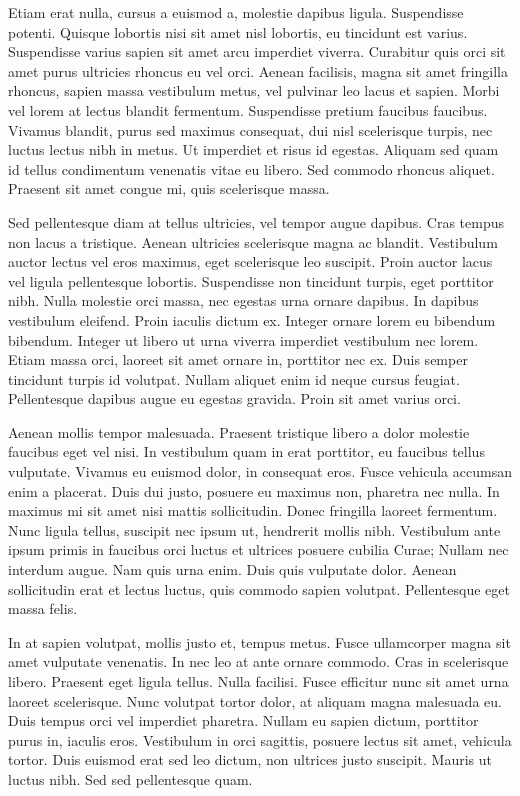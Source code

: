 Etiam erat nulla, cursus a euismod a, molestie dapibus ligula. Suspendisse potenti. Quisque lobortis nisi sit amet nisl lobortis, eu tincidunt est varius. Suspendisse varius sapien sit amet arcu imperdiet viverra. Curabitur quis orci sit amet purus ultricies rhoncus eu vel orci. Aenean facilisis, magna sit amet fringilla rhoncus, sapien massa vestibulum metus, vel pulvinar leo lacus et sapien. Morbi vel lorem at lectus blandit fermentum. Suspendisse pretium faucibus faucibus. Vivamus blandit, purus sed maximus consequat, dui nisl scelerisque turpis, nec luctus lectus nibh in metus. Ut imperdiet et risus id egestas. Aliquam sed quam id tellus condimentum venenatis vitae eu libero. Sed commodo rhoncus aliquet. Praesent sit amet congue mi, quis scelerisque massa.

Sed pellentesque diam at tellus ultricies, vel tempor augue dapibus. Cras tempus non lacus a tristique. Aenean ultricies scelerisque magna ac blandit. Vestibulum auctor lectus vel eros maximus, eget scelerisque leo suscipit. Proin auctor lacus vel ligula pellentesque lobortis. Suspendisse non tincidunt turpis, eget porttitor nibh. Nulla molestie orci massa, nec egestas urna ornare dapibus. In dapibus vestibulum eleifend. Proin iaculis dictum ex. Integer ornare lorem eu bibendum bibendum. Integer ut libero ut urna viverra imperdiet vestibulum nec lorem. Etiam massa orci, laoreet sit amet ornare in, porttitor nec ex. Duis semper tincidunt turpis id volutpat. Nullam aliquet enim id neque cursus feugiat. Pellentesque dapibus augue eu egestas gravida. Proin sit amet varius orci.

Aenean mollis tempor malesuada. Praesent tristique libero a dolor molestie faucibus eget vel nisi. In vestibulum quam in erat porttitor, eu faucibus tellus vulputate. Vivamus eu euismod dolor, in consequat eros. Fusce vehicula accumsan enim a placerat. Duis dui justo, posuere eu maximus non, pharetra nec nulla. In maximus mi sit amet nisi mattis sollicitudin. Donec fringilla laoreet fermentum. Nunc ligula tellus, suscipit nec ipsum ut, hendrerit mollis nibh. Vestibulum ante ipsum primis in faucibus orci luctus et ultrices posuere cubilia Curae; Nullam nec interdum augue. Nam quis urna enim. Duis quis vulputate dolor. Aenean sollicitudin erat et lectus luctus, quis commodo sapien volutpat. Pellentesque eget massa felis.

In at sapien volutpat, mollis justo et, tempus metus. Fusce ullamcorper magna sit amet vulputate venenatis. In nec leo at ante ornare commodo. Cras in scelerisque libero. Praesent eget ligula tellus. Nulla facilisi. Fusce efficitur nunc sit amet urna laoreet scelerisque. Nunc volutpat tortor dolor, at aliquam magna malesuada eu. Duis tempus orci vel imperdiet pharetra. Nullam eu sapien dictum, porttitor purus in, iaculis eros. Vestibulum in orci sagittis, posuere lectus sit amet, vehicula tortor. Duis euismod erat sed leo dictum, non ultrices justo suscipit. Mauris ut luctus nibh. Sed sed pellentesque quam.


